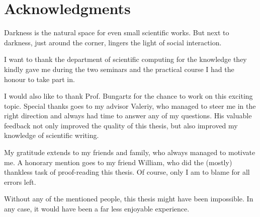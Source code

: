 \thispagestyle{empty}




\renewcommand{\dictumwidth}{\textwidth}
\chapter{Acknowledgments}
\vspace{1em}
Darkness is the natural space for even small scientific works.
But next to darkness, just around the corner, lingers the light of social interaction.

I want to thank the department of scientific computing for the knowledge they
kindly gave me during the two seminars and the practical course I had the honour
to take part in.

I would also like to thank Prof. Bungartz for the chance to work on this exciting topic.
Special thanks goes to my advisor Valeriy, who managed to steer me in the right direction and always had time to answer any of my questions.
His valuable feedback not only improved the quality of this thesis, but also
improved my knowledge of scientific writing.

My gratitude extends to my friends and family, who always managed to motivate me.
A honorary mention goes to my friend William, who did the (mostly) thankless task of proof-reading this thesis.
Of course, only I am to blame for all errors left.

Without any of the mentioned people, this thesis might have been impossible.
In any case, it would have been a far less enjoyable experience.

\cleardoublepage{}

